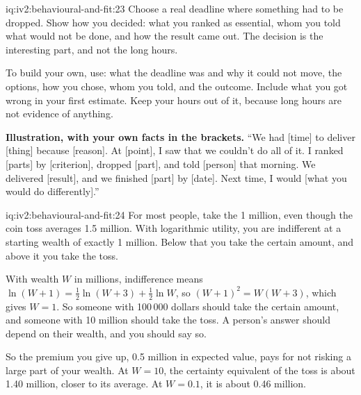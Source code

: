 \begin{solution}{iq:iv2:behavioural-and-fit:23}
Choose a real deadline where something had to be dropped. Show how you decided: what you ranked as essential, whom you told what would not be done, and how the result came out. The decision is the interesting part, and not the long hours.

To build your own, use: what the deadline was and why it could not move, the options, how you chose, whom you told, and the outcome. Include what you got wrong in your first estimate. Keep your hours out of it, because long hours are not evidence of anything.

\textbf{Illustration, with your own facts in the brackets.} ``We had [time] to deliver [thing] because [reason]. At [point], I saw that we couldn't do all of it. I ranked [parts] by [criterion], dropped [part], and told [person] that morning. We delivered [result], and we finished [part] by [date]. Next time, I would [what you would do differently].''

\end{solution}

\begin{solution}{iq:iv2:behavioural-and-fit:24}
For most people, take the 1 million, even though the coin toss averages 1.5 million. With logarithmic utility, you are indifferent at a starting wealth of exactly 1 million. Below that you take the certain amount, and above it you take the toss.

With wealth $W$ in millions, indifference means $\ln(W + 1) = \tfrac12\ln(W + 3) + \tfrac12\ln W$, so $(W + 1)^2 = W(W + 3)$, which gives $W = 1$. So someone with 100\,000 dollars should take the certain amount, and someone with 10 million should take the toss. A person's answer should depend on their wealth, and you should say so.

So the premium you give up, 0.5 million in expected value, pays for not risking a large part of your wealth. At $W = 10$, the certainty equivalent of the toss is about 1.40 million, closer to its average. At $W = 0.1$, it is about 0.46 million.

\end{solution}

